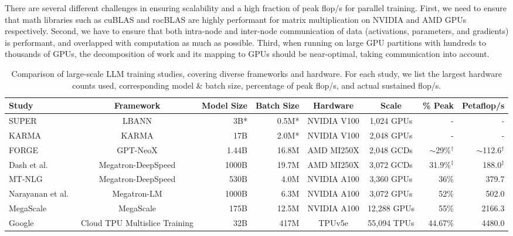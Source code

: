 There are several different challenges in ensuring scalability and a high
fraction of peak flop/s for parallel training. First, we need to ensure that
math libraries such as cuBLAS and rocBLAS are highly performant for matrix
multiplication on NVIDIA and AMD GPUs respectively. Second, we have to ensure
that both intra-node and inter-node communication of data (activations,
parameters, and gradients) is performant, and overlapped with computation as
much as possible. Third, when running on large GPU partitions with hundreds to
thousands of GPUs, the decomposition of work and its mapping to GPUs should be
near-optimal, taking communication into account.

\begin{table*}[t]
	\centering
    \caption{Comparison of large-scale LLM training studies, covering diverse
frameworks and hardware. For each study, we list the largest hardware counts
used, corresponding model \& batch size, percentage of peak flop/s, and actual
sustained flop/s.}
	\begin{tabular}{lcrrccrr} \toprule
		\textbf{Study} & \textbf{Framework} & \textbf{Model Size} & \textbf{Batch Size} & \textbf{Hardware} & \textbf{Scale} & \textbf{\% Peak} & \textbf{Petaflop/s}\\ \midrule
		SUPER~\cite{super2021jain}             & LBANN                   & 3B*   & 0.5M* & NVIDIA V100 & 1,024 GPUs & - & -\\
		KARMA~\cite{wahib2020scaling-sc}       &   KARMA                 & 17B   & 2.0M* & NVIDIA V100 & 2,048 GPUs & - & - \\
		FORGE~\cite{yin2023forge}              & GPT-NeoX                & 1.44B & 16.8M & AMD MI250X  & 2,048 GCDs & $\sim$29\%$^{\dagger}$ & $\sim$112.6$^{\dagger}$\\
		Dash et al.~\cite{dash2023optimizing}  & Megatron-DeepSpeed      & 1000B & 19.7M & AMD MI250X  & 3,072 GCDs & 31.9\%$^{\ddagger}$ & 188.0$^{\ddagger}$\\
		MT-NLG~\cite{megatron-turing-nlg-530b} & Megatron-DeepSpeed      & 530B  & 4.0M  & NVIDIA A100 & 3,360 GPUs & 36\% & 379.7\\
		Narayanan et al.~\cite{megatronlm-2}   & Megatron-LM             & 1000B & 6.3M  & NVIDIA A100 & 3,072 GPUs & 52\% & 502.0 \\
		MegaScale~\cite{jiang2024megascale}    & MegaScale               & 175B  & 12.5M & NVIDIA A100 & 12,288 GPUs& 55\%  & 2166.3 \\
		Google~\cite{gcloudscaletraining}      & Cloud TPU Multislice Training & 32B   & 417M  & TPUv5e      & 55,094 TPUs& 44.67\% & 4480.0\\

\end{tabular}
\end{table*}
